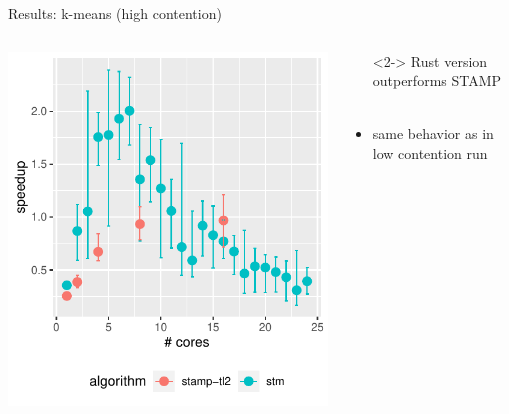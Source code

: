 \documentclass[aspectratio=169, usenames, dvipsnames]{beamer}
\newcommand{\cmark}{\ding{51}}%
\newcommand{\done}{\rlap{$\square$}{\raisebox{2pt}{\large\hspace{1pt}\cmark}}%
\hspace{-2.5pt}}
\begin{document}
\begin{frame}{Results: k-means (high contention)}
    \begin{columns}%
        \begin{column}{0.5\textwidth}
            \centering
            \includegraphics[width=\textwidth,height=.65\textheight,keepaspectratio]{img/combined_plots/kmeans-high++}%
        \end{column}%
        \begin{column}{0.5\textwidth}
            \begin{itemize}
                \item[\done]<2-> Rust version outperforms STAMP\\ \ 
            \end{itemize}
            
            \begin{itemize}
                \item<3-> same behavior as in low contention run
            \end{itemize}
        \end{column}
    \end{columns}
\end{frame}
\end{document}
